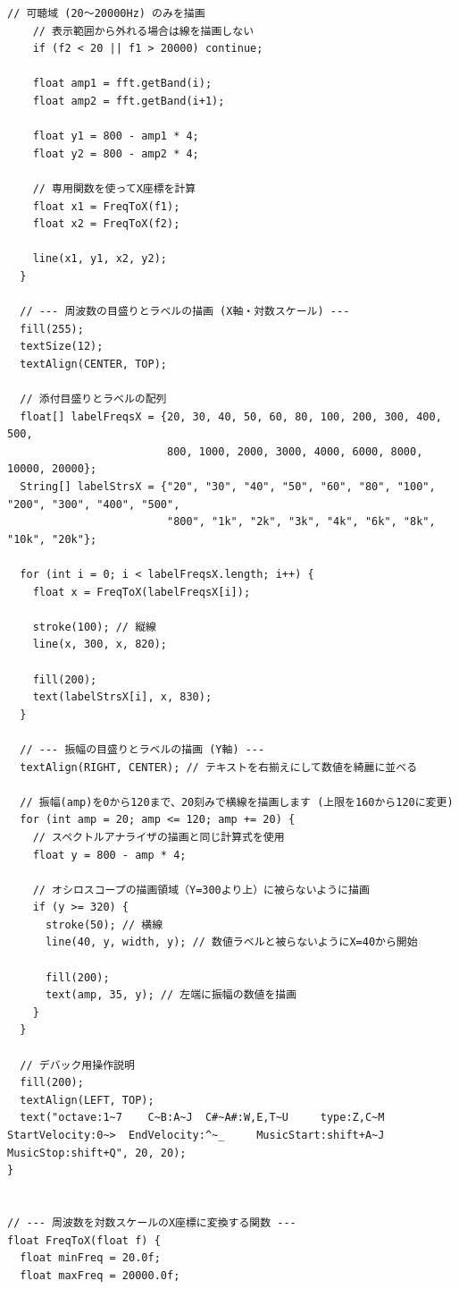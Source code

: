 \begin{lstlisting}[caption={SoundProcessingCode.pde}, label={lst:proc_main}]
    // 可聴域 (20〜20000Hz) のみを描画
    // 表示範囲から外れる場合は線を描画しない
    if (f2 < 20 || f1 > 20000) continue;
    
    float amp1 = fft.getBand(i);
    float amp2 = fft.getBand(i+1);
    
    float y1 = 800 - amp1 * 4;
    float y2 = 800 - amp2 * 4;
    
    // 専用関数を使ってX座標を計算
    float x1 = FreqToX(f1);
    float x2 = FreqToX(f2);
    
    line(x1, y1, x2, y2);
  }
  
  // --- 周波数の目盛りとラベルの描画 (X軸・対数スケール) ---
  fill(255);
  textSize(12);
  textAlign(CENTER, TOP);
  
  // 添付目盛りとラベルの配列
  float[] labelFreqsX = {20, 30, 40, 50, 60, 80, 100, 200, 300, 400, 500,
                         800, 1000, 2000, 3000, 4000, 6000, 8000, 10000, 20000};
  String[] labelStrsX = {"20", "30", "40", "50", "60", "80", "100", "200", "300", "400", "500",
                         "800", "1k", "2k", "3k", "4k", "6k", "8k", "10k", "20k"};
  
  for (int i = 0; i < labelFreqsX.length; i++) {
    float x = FreqToX(labelFreqsX[i]);
    
    stroke(100); // 縦線
    line(x, 300, x, 820);
    
    fill(200);
    text(labelStrsX[i], x, 830); 
  }
  
  // --- 振幅の目盛りとラベルの描画 (Y軸) ---
  textAlign(RIGHT, CENTER); // テキストを右揃えにして数値を綺麗に並べる
  
  // 振幅(amp)を0から120まで、20刻みで横線を描画します (上限を160から120に変更)
  for (int amp = 20; amp <= 120; amp += 20) {
    // スペクトルアナライザの描画と同じ計算式を使用
    float y = 800 - amp * 4;
    
    // オシロスコープの描画領域（Y=300より上）に被らないように描画
    if (y >= 320) {
      stroke(50); // 横線
      line(40, y, width, y); // 数値ラベルと被らないようにX=40から開始
      
      fill(200);
      text(amp, 35, y); // 左端に振幅の数値を描画
    }
  }
  
  // デバック用操作説明
  fill(200);
  textAlign(LEFT, TOP);
  text("octave:1~7    C~B:A~J  C#~A#:W,E,T~U     type:Z,C~M     StartVelocity:0~>  EndVelocity:^~_     MusicStart:shift+A~J   MusicStop:shift+Q", 20, 20);
}


// --- 周波数を対数スケールのX座標に変換する関数 ---
float FreqToX(float f) {
  float minFreq = 20.0f;
  float maxFreq = 20000.0f;
  

\end{lstlisting}
